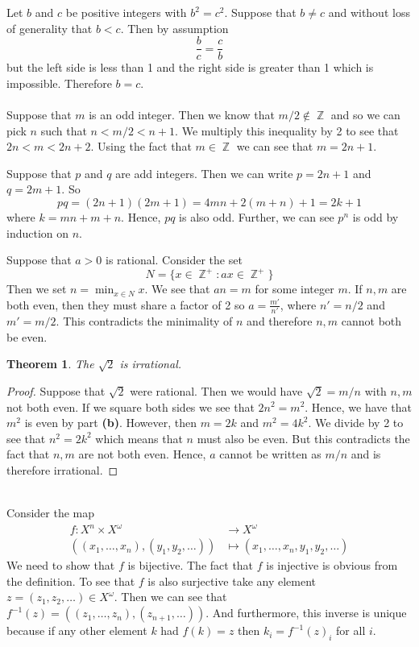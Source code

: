 \documentclass{article}
\DeclareMathOperator{\Z}{\mathbb{Z}}
\DeclareMathOperator{\lra}{\longrightarrow}
\newcommand{\problem}[1]{\noindent{\textbf{Problem #1}}\\}
\newcommand{\problempart}[1]{\noindent{\textbf{(#1)}}}
\newtheorem*{thm}{Theorem}
\begin{document}
\problempart{d} Let $b$ and $c$ be positive integers with $b^2 = c^2$. Suppose that $b \neq c$ and without loss of generality that $b < c$. Then by assumption
\[
\frac{b}{c} = \frac{c}{b}
\]
but the left side is less than 1 and the right side is greater than 1 which is impossible. Therefore $b = c$. \\

\problem{11} 
\problempart{a} Suppose that $m$ is an odd integer. Then we know that $m/2 \not\in \Z$ and so we can pick $n$ such that $n < m/2 < n+1$. We multiply this inequality by 2 to see that $2n < m < 2n + 2$. Using the fact that $m\in \Z$ we can see that $m = 2n+1$. 

\problempart{b} Suppose that $p$ and $q$ are add integers. Then we can write $p = 2n + 1$ and $q = 2m+1$. So 
\[
pq = (2n+1)(2m+1) = 4mn + 2(m+n) + 1 = 2k + 1
\]
where $k = mn + m + n$. Hence, $pq$ is also odd. Further, we can see $p^n$ is odd by induction on $n$.

\problempart{c} Suppose that $a > 0$ is rational. Consider the set 
\[
N = \{x \in \Z^+ : ax \in \Z^+\}
\]
Then we set $n = \min_{x \in N} x$. We see that $an = m$ for some integer $m$. If $n, m$ are both even, then they must share a factor of 2 so $a = \frac{m'}{n'}$, where $n' = n/2$ and $m' = m/2$. This contradicts the minimality of $n$ and therefore $n,m$ cannot both be even.
  
\problempart{d} 
\begin{thm}
The $\sqrt{2}$ is irrational.
\end{thm}
\begin{proof}
Suppose that $\sqrt{2}$ were rational. Then we would have $\sqrt{2} = m/n$ with $n,m$ not both even. If we square both sides we see that $2n^2 = m^2$. Hence, we have that $m^2$ is even by part {\bf (b)}. However, then $m = 2k$ and $m^2 = 4k^2$. We divide by 2 to see that $n^2 = 2k^2$ which means that $n$ must also be even. But this contradicts the fact that $n,m$ are not both even. Hence, $a$ cannot be written as $m/n$ and is therefore irrational. 
\end{proof}

\problem{4}
\problempart{d} Consider the map
\begin{align*}
f: X^n \times X^\omega &\lra X^\omega \\
((x_1, \ldots, x_n),(y_1,y_2,\ldots)) &\mapsto (x_1,\ldots, x_n,y_1,y_2,\ldots)  
\end{align*}
We need to show that $f$ is bijective. The fact that $f$ is injective is obvious from the definition. To see that $f$ is also surjective take any element $z = (z_1, z_2,\ldots) \in X^\omega$. Then we can see that $f^{-1}(z) = ((z_1,\ldots, z_n), (z_{n+1},\ldots))$. And furthermore, this inverse is unique because if any other element $k$ had $f(k) = z$ then $k_i = f^{-1}(z)_i$ for all $i$.  
\end{document}
